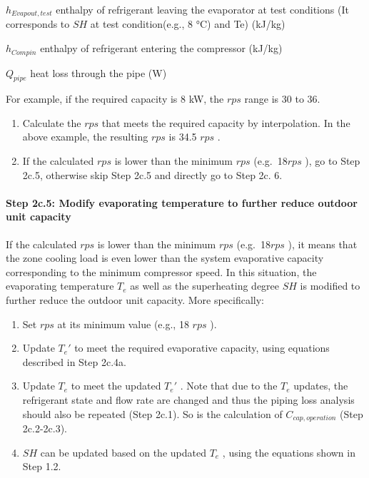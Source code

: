 \(h_{Evapout,test}\) enthalpy of refrigerant leaving the evaporator at test conditions (It corresponds to \(SH\) at test condition(e.g., 8 °C) and Te) (kJ/kg)

\(h_{Compin}\) enthalpy of refrigerant entering the compressor (kJ/kg)

\(Q_{pipe}\) heat loss through the pipe (W)

For example, if the required capacity is 8 kW, the \(rps\) range is 30 to 36.

\begin{enumerate}
\def\labelenumi{\alph{enumi}.}
\setcounter{enumi}{2}
\item
  Calculate the \(rps\) that meets the required capacity by interpolation. In the above example, the resulting \(rps\) is 34.5 \(rps\) .
\item
  If the calculated \(rps\) is lower than the minimum \(rps\) (e.g.~18\(rps\) ), go to Step 2c.5, otherwise skip Step 2c.5 and directly go to Step 2c. 6.
\end{enumerate}

\paragraph{Step 2c.5: Modify evaporating temperature to further reduce outdoor unit capacity}\label{step-2c.5-modify-evaporating-temperature-to-further-reduce-outdoor-unit-capacity}

If the calculated \(rps\) is lower than the minimum \(rps\) (e.g.~18\(rps\) ), it means that the zone cooling load is even lower than the system evaporative capacity corresponding to the minimum compressor speed. In this situation, the evaporating temperature \(T_e\) as well as the superheating degree \(SH\) is modified to further reduce the outdoor unit capacity. More specifically:

\begin{enumerate}
\def\labelenumi{\alph{enumi}.}
\item
  Set \(rps\) at its minimum value (e.g., 18 \(rps\) ).
\item
  Update \({T_e}'\) to meet the required evaporative capacity, using equations described in Step 2c.4a.
\item
  Update \(T_e\) to meet the updated \({T_e}'\) . Note that due to the \(T_e\) updates, the refrigerant state and flow rate are changed and thus the piping loss analysis should also be repeated (Step 2c.1). So is the calculation of \(C_{cap,operation}\) (Step 2c.2-2c.3).
\item
  \(SH\) can be updated based on the updated \(T_e\) , using the equations shown in Step 1.2.
\end{enumerate}


